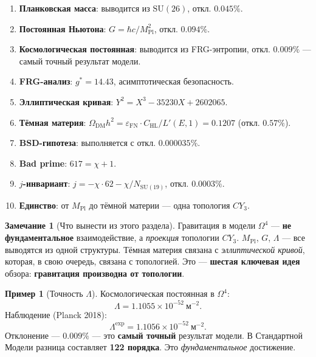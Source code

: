 \documentclass[11pt,a4paper]{article}
\newcommand{\SU}{\mathrm{SU}}
\newcommand{\CY}{CY_3}
\newcommand{\Om}{\Omega^4}
\newcommand{\Mpl}{M_{\text{Pl}}}
\newcommand{\epsFN}{\varepsilon_{\text{FN}}}
\theoremstyle{definition}
\newtheorem{remark}[theorem]{Замечание}
\newtheorem{example}[theorem]{Пример}
\begin{document}
\begin{enumerate}
    \item \textbf{Планковская масса}: выводится из $\SU(26)$, 
          откл. $0.045\%$.
    \item \textbf{Постоянная Ньютона}: $G = \hbar c/\Mpl^2$, 
          откл. $0.094\%$.
    \item \textbf{Космологическая постоянная}: выводится из 
          FRG-энтропии, откл. $\mathbf{0.009\%}$ — самый точный 
          результат модели.
    \item \textbf{FRG-анализ}: $g^* = 14.43$, асимптотическая 
          безопасность.
    \item \textbf{Эллиптическая кривая}: 
          $Y^2 = X^3 - 35230X + 2602065$.
    \item \textbf{Тёмная материя}: $\Omega_{\text{DM}} h^2 
          = \epsFN \cdot C_{\text{HL}}/L'(E,1) = 0.1207$ 
          (откл. $0.57\%$).
    \item \textbf{BSD-гипотеза}: выполняется с откл. $0.000035\%$.
    \item \textbf{Bad prime}: $617 = \chi + 1$.
    \item \textbf{$j$-инвариант}: 
          $j = -\chi \cdot 62 - \chi/N_{\SU(19)}$, откл. $0.0003\%$.
    \item \textbf{Единство}: от $\Mpl$ до тёмной материи — 
          одна топология $\CY$.
\end{enumerate}

\begin{remark}[Что вынести из этого раздела]
\label{rem:gravity-takeaway}
Гравитация в модели $\Om$ — \textbf{не фундаментальное} 
взаимодействие, а \emph{проекция} топологии $\CY$. 
$\Mpl$, $G$, $\Lambda$ — все выводятся из одной структуры. 
Тёмная материя связана с \emph{эллиптической кривой}, которая, 
в свою очередь, связана с топологией. Это — \textbf{шестая 
ключевая идея} обзора: \textbf{гравитация производна 
от топологии}.
\end{remark}

\begin{example}[Точность $\Lambda$]
\label{ex:lambda-precision}
Космологическая постоянная в $\Om$:
\begin{equation}
    \Lambda = 1.1055 \times 10^{-52}~\text{м}^{-2}.
\end{equation}
Наблюдение (Planck 2018):
\begin{equation}
    \Lambda^{\text{exp}} = 1.1056 \times 10^{-52}~\text{м}^{-2}.
\end{equation}
Отклонение — $0.009\%$ — это \textbf{самый точный} результат 
модели. В Стандартной Модели разница составляет 
\textbf{122 порядка}. Это \emph{фундаментальное} достижение.
\end{example}
\end{document}
